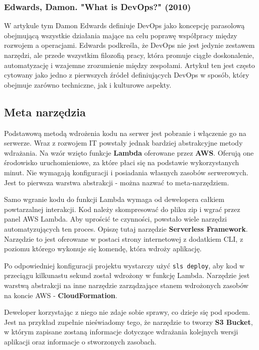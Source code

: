 \documentclass{article}
\begin{document}
\subsubsection{Edwards, Damon. "What is DevOps?" (2010)\cite{damonEdwards}}
W artykule tym Damon Edwards definiuje DevOps jako koncepcję parasolową obejmującą wszystkie działania mające na celu poprawę współpracy między rozwojem a operacjami. Edwards podkreśla, że DevOps nie jest jedynie zestawem narzędzi, ale przede wszystkim filozofią pracy, która promuje ciągłe doskonalenie, automatyzację i wzajemne zrozumienie między zespołami. Artykuł ten jest często cytowany jako jedno z pierwszych źródeł definiujących DevOps w sposób, który obejmuje zarówno techniczne, jak i kulturowe aspekty.

\subsection{Meta narzędzia} \label{subsectionMetaNarzedzia}

Podstawową metodą wdrożenia kodu na serwer jest pobranie i włączenie go na serwerze. Wraz z rozwojem IT powstały jednak bardziej abstrakcyjne metody wdrażania. Na wzór wzięto funkcje \textbf{Lambda} oferowane przez \textbf{AWS}. Oferują one środowisko uruchomieniowe, za które płaci się na podstawie wykorzystanych minut. Nie wymagają konfiguracji i posiadania własnych zasobów serwerowych. Jest to pierwsza warstwa abstrakcji - można nazwać to meta-narzędziem.

Samo wgranie kodu do funkcji Lambda wymaga od dewelopera całkiem powtarzalnej interakcji. Kod należy skompresować do pliku zip i wgrać przez panel AWS Lambda. Aby uprościć te czynności, powstało wiele narzędzi automatyzujących ten proces. Opiszę tutaj narzędzie \textbf{Serverless Framework}. Narzędzie to jest oferowane w postaci strony internetowej z dodatkiem CLI, z poziomu którego wykonuje się komendę, która wdroży aplikację.

Po odpowiedniej konfiguracji projektu wystarczy użyć \lstinline|sls deploy|, aby kod w przeciągu kilkunastu sekund został wdrożony w funkcję Lambda. Narzędzie jest warstwą abstrakcji na inne narzędzie zarządzające stanem wdrożonych zasobów na koncie AWS - \textbf{CloudFormation}.

Deweloper korzystając z niego nie zdaje sobie sprawy, co dzieje się pod spodem. Jest na przykład zupełnie nieświadomy tego, że narzędzie to tworzy \textbf{S3 Bucket}, w którym zapisane zostaną informacje dotyczące wdrażania kolejnych wersji aplikacji oraz informacje o stworzonych zasobach.
\end{document}
